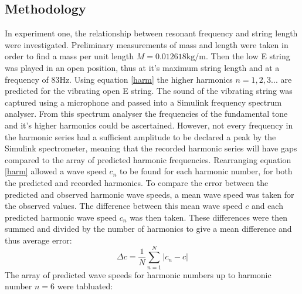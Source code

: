 \documentclass[12pt]{article}
\begin{document}
        \subsection{Methodology}
            In experiment one, the relationship between resonant frequency and string length were investigated.
            Preliminary measurements of mass and length were taken in order to find a mass per unit length $M = 0.012618\si{\kilogram\per\meter}$.
            Then the low E string was played in an open position, thus at it's maximum string length and at a frequency of $83\si{\hertz}$.
            Using equation \ref{harm} the higher harmonics $n = 1, 2 ,3 ...$ are predicted for the vibrating open E string.
            The sound of the vibrating string was captured using a microphone and passed into a Simulink frequency spectrum analyser.
            From this spectrum analyser the frequencies of the fundamental tone and it's higher harmonics could be ascertained.
            However, not every frequency in the harmonic series had a sufficient amplitude to be declared a peak by the Simulink spectrometer, meaning that the recorded harmonic series will have gaps compared to the array of predicted harmonic frequencies.
            Rearranging equation \ref{harm} allowed a wave speed $c_n$ to be found for each harmonic number, for both the predicted and recorded harmonics.
            To compare the error between the predicted and observed harmonic wave speeds, a mean wave speed was taken for the observed values.
            The difference between this mean wave speed $c$ and each predicted harmonic wave speed $c_n$ was then taken.
            These differences were then summed and divided by the number of harmonics to give a mean difference and thus average error:
            \begin{equation}
                \Delta c = \frac{1}{N}\sum_{n=1}^{N} | c_n - c |
            \end{equation}
            The array of predicted wave speeds for harmonic numbers up to harmonic number $n=6$ were tabluated:
            

           

        
\end{document}
